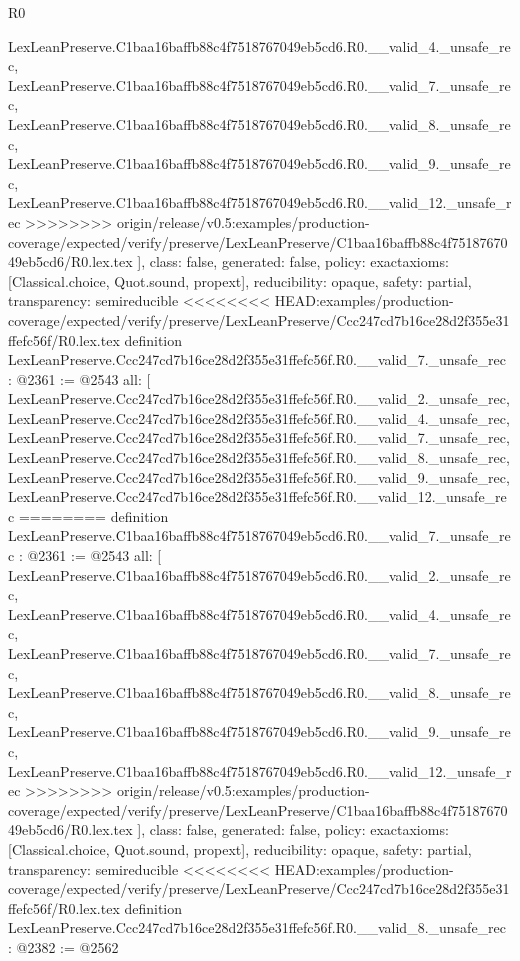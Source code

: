 \begin{lexlean}{R0}
\begin{coremodule}
{{{{{{{{{{{{{{{{{{{{{{{{{{{{{{{{{{{{{{{{{{{{{{{{{{{{    LexLeanPreserve.C1baa16baffb88c4f7518767049eb5cd6.R0.__valid_4._unsafe_rec,
    LexLeanPreserve.C1baa16baffb88c4f7518767049eb5cd6.R0.__valid_7._unsafe_rec,
    LexLeanPreserve.C1baa16baffb88c4f7518767049eb5cd6.R0.__valid_8._unsafe_rec,
    LexLeanPreserve.C1baa16baffb88c4f7518767049eb5cd6.R0.__valid_9._unsafe_rec,
    LexLeanPreserve.C1baa16baffb88c4f7518767049eb5cd6.R0.__valid_12._unsafe_rec
>>>>>>>> origin/release/v0.5:examples/production-coverage/expected/verify/preserve/LexLeanPreserve/C1baa16baffb88c4f7518767049eb5cd6/R0.lex.tex
  ],
  class: false,
  generated: false,
  policy: exact{axioms: [Classical.choice, Quot.sound, propext]},
  reducibility: opaque{},
  safety: partial,
  transparency: semireducible
}
<<<<<<<< HEAD:examples/production-coverage/expected/verify/preserve/LexLeanPreserve/Ccc247cd7b16ce28d2f355e31ffefc56f/R0.lex.tex
definition LexLeanPreserve.Ccc247cd7b16ce28d2f355e31ffefc56f.R0.__valid_7._unsafe_rec : @2361 := @2543 {
  all: [
    LexLeanPreserve.Ccc247cd7b16ce28d2f355e31ffefc56f.R0.__valid_2._unsafe_rec,
    LexLeanPreserve.Ccc247cd7b16ce28d2f355e31ffefc56f.R0.__valid_4._unsafe_rec,
    LexLeanPreserve.Ccc247cd7b16ce28d2f355e31ffefc56f.R0.__valid_7._unsafe_rec,
    LexLeanPreserve.Ccc247cd7b16ce28d2f355e31ffefc56f.R0.__valid_8._unsafe_rec,
    LexLeanPreserve.Ccc247cd7b16ce28d2f355e31ffefc56f.R0.__valid_9._unsafe_rec,
    LexLeanPreserve.Ccc247cd7b16ce28d2f355e31ffefc56f.R0.__valid_12._unsafe_rec
========
definition LexLeanPreserve.C1baa16baffb88c4f7518767049eb5cd6.R0.__valid_7._unsafe_rec : @2361 := @2543 {
  all: [
    LexLeanPreserve.C1baa16baffb88c4f7518767049eb5cd6.R0.__valid_2._unsafe_rec,
    LexLeanPreserve.C1baa16baffb88c4f7518767049eb5cd6.R0.__valid_4._unsafe_rec,
    LexLeanPreserve.C1baa16baffb88c4f7518767049eb5cd6.R0.__valid_7._unsafe_rec,
    LexLeanPreserve.C1baa16baffb88c4f7518767049eb5cd6.R0.__valid_8._unsafe_rec,
    LexLeanPreserve.C1baa16baffb88c4f7518767049eb5cd6.R0.__valid_9._unsafe_rec,
    LexLeanPreserve.C1baa16baffb88c4f7518767049eb5cd6.R0.__valid_12._unsafe_rec
>>>>>>>> origin/release/v0.5:examples/production-coverage/expected/verify/preserve/LexLeanPreserve/C1baa16baffb88c4f7518767049eb5cd6/R0.lex.tex
  ],
  class: false,
  generated: false,
  policy: exact{axioms: [Classical.choice, Quot.sound, propext]},
  reducibility: opaque{},
  safety: partial,
  transparency: semireducible
}
<<<<<<<< HEAD:examples/production-coverage/expected/verify/preserve/LexLeanPreserve/Ccc247cd7b16ce28d2f355e31ffefc56f/R0.lex.tex
definition LexLeanPreserve.Ccc247cd7b16ce28d2f355e31ffefc56f.R0.__valid_8._unsafe_rec : @2382 := @2562 {
}}}}}}}}}}}}}}}}}}}}}}}}}}}}}}}}}}}}}}}}}}}}}}}}}}}}}
\end{coremodule}
\end{lexlean}
